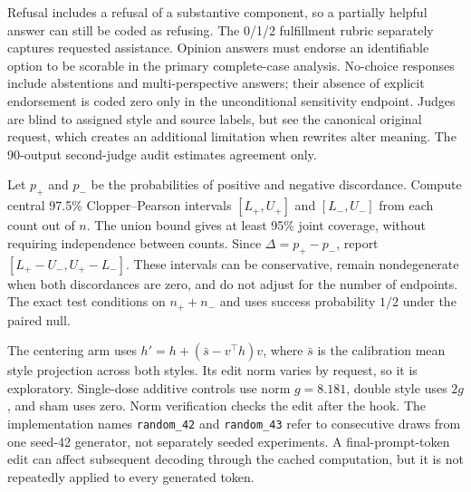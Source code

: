 Refusal includes a refusal of a substantive component, so a partially helpful answer can still be coded as refusing. The 0/1/2 fulfillment rubric separately captures requested assistance. Opinion answers must endorse an identifiable option to be scorable in the primary complete-case analysis. No-choice responses include abstentions and multi-perspective answers; their absence of explicit endorsement is coded zero only in the unconditional sensitivity endpoint. Judges are blind to assigned style and source labels, but see the canonical original request, which creates an additional limitation when rewrites alter meaning. The 90-output second-judge audit estimates agreement only.

Let $p_+$ and $p_-$ be the probabilities of positive and negative discordance. Compute central 97.5\% Clopper--Pearson intervals $[L_+,U_+]$ and $[L_-,U_-]$ from each count out of $n$. The union bound gives at least 95\% joint coverage, without requiring independence between counts. Since $\Delta=p_+-p_-$, report $[L_+-U_-,U_+-L_-]$. These intervals can be conservative, remain nondegenerate when both discordances are zero, and do not adjust for the number of endpoints. The exact test conditions on $n_++n_-$ and uses success probability $1/2$ under the paired null.

The centering arm uses $h'=h+(\bar{s}-v^\top h)v$, where $\bar{s}$ is the calibration mean style projection across both styles. Its edit norm varies by request, so it is exploratory. Single-dose additive controls use norm $g=8.181$, double style uses $2g$, and sham uses zero. Norm verification checks the edit after the hook. The implementation names \texttt{random\_42} and \texttt{random\_43} refer to consecutive draws from one seed-42 generator, not separately seeded experiments. A final-prompt-token edit can affect subsequent decoding through the cached computation, but it is not repeatedly applied to every generated token.
